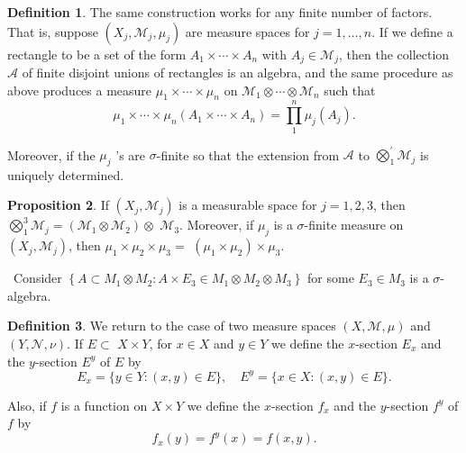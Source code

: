 \documentclass[12pt,a4paper]{book}
\newenvironment{prooff}{{\noindent\it\textcolor{cyan!40!black}{Proof}:}\,}{\par}
\newcommand{\bbrace}[1]{\left\{ #1 \right\} }
\theoremstyle{definition}
\newtheorem{defn}{Definition}[section]
\newtheorem{prop}[defn]{Proposition}
\begin{document}
\begin{defn}
    The same construction works for any finite number of factors. That is, suppose $\left(X_j, \mathcal{M}_j, \mu_j\right)$ are measure spaces for $j=1, \ldots, n$. If we define a rectangle to be a set of the form $A_1 \times \cdots \times A_n$ with $A_j \in \mathcal{M}_j$, then the collection $\mathcal{A}$ of finite disjoint unions of rectangles is an algebra, and the same procedure as above produces a measure $\mu_1 \times \cdots \times \mu_n$ on $\mathcal{M}_1 \otimes \cdots \otimes \mathcal{M}_n$ such that
    $$
        \mu_1 \times \cdots \times \mu_n\left(A_1 \times \cdots \times A_n\right)=\prod_1^n \mu_j\left(A_j\right) .
    $$

    Moreover, if the $\mu_j$ 's are $\sigma$-finite so that the extension from $\mathcal{A}$ to $\bigotimes_1^{\prime} \mathcal{M}_j$ is uniquely determined.
\end{defn}
\begin{prop}
    If $\left(X_j, \mathcal{M}_j\right)$ is a measurable space for $j=1,2,3$, then $\bigotimes_1^3 \mathcal{M}_j=\left(\mathcal{M}_1 \otimes \mathcal{M}_2\right) \otimes$ $\mathcal{M}_3$.
    Moreover, if $\mu_j$ is a $\sigma$-finite measure on $\left(X_j, \mathcal{M}_j\right)$, then $\mu_1 \times \mu_2 \times \mu_3=$ $\left(\mu_1 \times \mu_2\right) \times \mu_3$.
\end{prop}
\begin{prooff}
    Consider $\bbrace{A\subset M_1\otimes M_2:A\times E_3\in M_1\otimes M_2\otimes M_3}$ for some $E_3\in M_3$ is a $\sigma$-algebra.
\end{prooff}
\begin{defn}
    We return to the case of two measure spaces $(X, \mathcal{M}, \mu)$ and $(Y, \mathcal{N}, \nu)$.
    If $E \subset$ $X \times Y$, for $x \in X$ and $y \in Y$ we define the $x$-section $E_x$ and the $y$-section $E^y$ of $E$ by
    $$
        E_x=\{y \in Y:(x, y) \in E\}, \quad E^y=\{x \in X:(x, y) \in E\} .
    $$

    Also, if $f$ is a function on $X \times Y$ we define the $x$-section $f_x$ and the $y$-section $f^y$ of $f$ by
    $$
        f_x(y)=f^y(x)=f(x, y) .
    $$
\end{defn}
\end{document}
